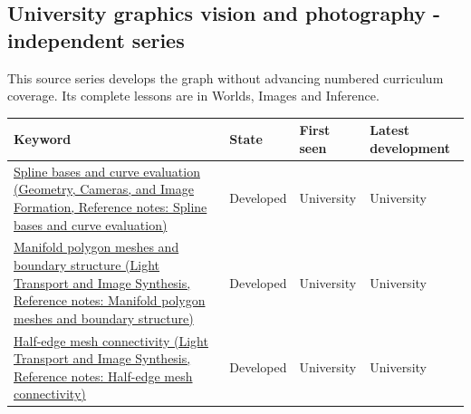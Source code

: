 \subsection{University graphics vision and photography - independent series}\label{appendix-a6d556a4ef50-university-graphics-vision-and-photography---independent-series}

\hypertarget{appendix-a6d556a4ef50-university-graphics-vision-and-photography---independent-series}{}

This source series develops the graph without advancing numbered curriculum coverage. Its complete lessons are in {Worlds, Images and Inference}.

{\def\LTcaptype{none} %
\begin{longtable}[]{@{}
  >{\raggedright\arraybackslash}p{}
  >{\raggedright\arraybackslash}p{}
  >{\raggedright\arraybackslash}p{}
  >{\raggedright\arraybackslash}p{}@{}}
\toprule\noalign{}
\begin{minipage}[b]{\linewidth}\raggedright
Keyword
\end{minipage} & \begin{minipage}[b]{\linewidth}\raggedright
State
\end{minipage} & \begin{minipage}[b]{\linewidth}\raggedright
First seen
\end{minipage} & \begin{minipage}[b]{\linewidth}\raggedright
Latest development
\end{minipage} \\
\midrule\noalign{}
\endhead
\bottomrule\noalign{}
\endlastfoot
\href{../03-Geometry-Cameras-and-Image-Formation/main.pdf\#nameddest=appendix-f28eeec97a3d}{Spline bases and curve evaluation (Geometry, Cameras, and Image Formation, Reference notes: Spline bases and curve evaluation)} & Developed & University & University \\
\href{../04-Light-Transport-and-Image-Synthesis/main.pdf\#nameddest=appendix-fab348609369}{Manifold polygon meshes and boundary structure (Light Transport and Image Synthesis, Reference notes: Manifold polygon meshes and boundary structure)} & Developed & University & University \\
\href{../04-Light-Transport-and-Image-Synthesis/main.pdf\#nameddest=appendix-1aea26b2307f}{Half-edge mesh connectivity (Light Transport and Image Synthesis, Reference notes: Half-edge mesh connectivity)} & Developed & University & University \\

\end{longtable}}

